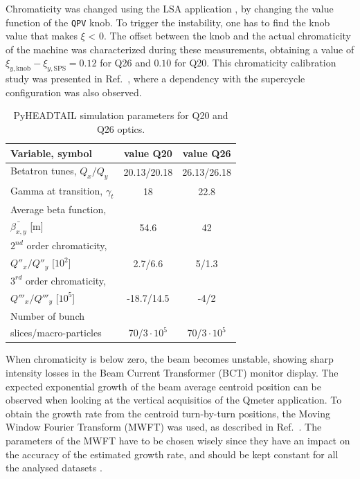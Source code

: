 \documentclass[a4paper,
               keeplastbox,   %
               ]{jacow}
\begin{document}
Chromaticity was changed using the LSA application \cite{Arduini:2012hma}, by changing the value function of the \texttt{QPV} knob. To trigger the instability, one has to find the knob value that makes $\xi$ < 0. The offset between the knob and the actual chromaticity of the machine was characterized during these measurements, obtaining a value of $\xi_{y, \text{knob}} - \xi_{y, \text{SPS}} = 0.12$ for Q26 and $0.10$ for Q20. This chromaticity calibration study was presented in Ref.~\cite{delafuente2023measurements}, where a dependency with the supercycle configuration was also observed.
\begin{table}[!hbt]
   \centering
   \caption{PyHEADTAIL simulation parameters for Q20 and Q26 optics.}
   \begin{tabular}{p{37mm} c c}
       \toprule
       \textbf{Variable, symbol} & \textbf{value Q20} & \textbf{value Q26}  \\               
       \midrule
           Betatron tunes, $Q_x/Q_y$  &  20.13/20.18 & 26.13/26.18   \\ %
           Gamma at transition, $\gamma_t$  & 18 & 22.8   \\ %
           Average beta function, \\ $\bar{\beta_{x,y}}$ [m] & 54.6 & 42 \\ %
           $2^{nd}$ order chromaticity, \\ $Q''_x/Q''_y$ [$10^2$]  & 2.7/6.6 & 5/1.3  \\ %
           $3^{rd}$ order chromaticity, \\ $Q'''_x/Q'''_y$ [$10^5$]  & -18.7/14.5 & -4/2  \\ %
           Number of bunch \\ slices/macro-particles  & 70/$3\cdot10^5$ & 70/$3\cdot10^5$  \\ %
       \bottomrule
   \end{tabular}
   \label{t1}
\end{table}


When chromaticity is below zero, the beam becomes unstable, showing sharp intensity losses in the Beam Current Transformer (BCT) monitor display. The expected exponential growth of the beam average centroid position can be observed when looking at the vertical acquisitios of the Qmeter application. To obtain the growth rate from the centroid turn-by-turn positions, the Moving Window Fourier Transform (MWFT) was used, as described in Ref.~\cite{burkhardt2002coherent}. The parameters of the MWFT have to be chosen wisely since they have an impact on the accuracy of the estimated growth rate, and should be kept constant for all the analysed datasets \cite{delafuente2023simulations}.
\end{document}
